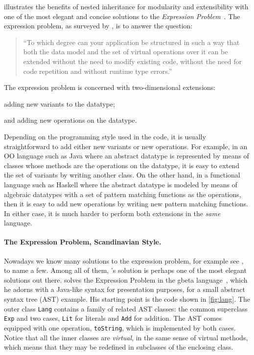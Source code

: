 \citet{ernst2004expression} illustrates the benefits of nested inheritance for modularity
and extensibility with one of the most elegant and concise solutions to the
\emph{Expression Problem}~\citep{wadler1998expression}. The expression problem,
as surveyed by \citet{togersen:2004}, is to answer the question:
\begin{quote}
  ``To which degree can your application be structured in such a way that both
  the data model and the set of virtual operations over it can be extended
  without the need to modify existing code, without the need for code repetition
  and without runtime type errors.''
\end{quote}
The expression problem is concerned with two-dimensional extensions:
\begin{inparaenum}[(1)]
\item adding new variants to the datatype;
\item and adding new operations on the datatype.
\end{inparaenum}
Depending on the programming style used in the code, it is usually
straightforward to add either new variants or new operations. For example, in an
OO language such as Java where an abstract datatype is represented by means of
classes whose methods are the operations on the datatype, it is easy to extend
the set of variants by writing another class. On the other hand, in a functional
language such as Haskell where the abstract datatype is modeled by means of
algebraic datatypes with a set of pattern matching functions as the operations,
then it is easy to add new operations by writing new pattern matching functions.
In either case, it is much harder to perform both extensions in the
\textit{same} language.


\paragraph{The Expression Problem, Scandinavian Style.}

Nowadays we know many solutions to the expression problem, for example see
\citet{oliveira2012extensibility, wang2016expression, oliveira09modular,
  swierstra_2008, Zenger-Odersky2005}, to name a few. Among all of them,
\citeauthor{ernst2004expression}'s solution is perhaps one of the most elegant
solutions out there. \citeauthor{ernst2004expression} solves the Expression
Problem in the \textsf{gbeta} language~\citep{ernst2000gbeta}, which he adorns with a Java-like syntax for
presentation purposes, for a small abstract syntax tree (AST) example. His
starting point is the code shown in \cref{fig:lang}. The outer class
\lstinline{Lang} contains a family of related AST classes: the common superclass
\lstinline{Exp} and two cases, \lstinline{Lit} for literals and \lstinline{Add}
for addition. The AST comes equipped with one operation, \lstinline{toString},
which is implemented by both cases. Notice that all the inner classes are
\textit{virtual}, in the same sense of virtual methods, which means that they
may be redefined in subclasses of the enclosing class.


